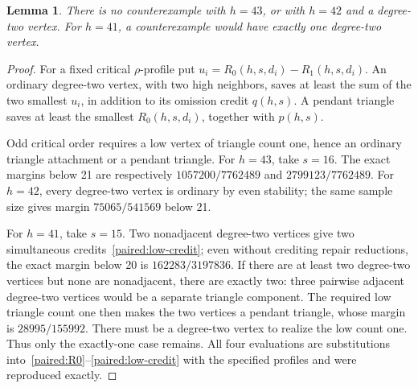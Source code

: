 \documentclass[11pt,a4paper]{article}
\newtheorem{lemma}[theorem]{Lemma}
\theoremstyle{definition}\newtheorem{definition}[theorem]{Definition}
\theoremstyle{remark}\newtheorem{remark}[theorem]{Remark}
\begin{document}
\begin{lemma}\label{paired:4342-degree2}
There is no counterexample with $h=43$, or with $h=42$ and a
degree-two vertex. For $h=41$, a counterexample would have exactly
one degree-two vertex.
\end{lemma}
\begin{proof}
For a fixed critical $\rho$-profile put $u_i=R_0(h,s,d_i)-R_1(h,s,d_i)$.
An ordinary degree-two vertex, with two high neighbors, saves at least
the sum of the two smallest $u_i$, in addition to its omission
credit $q(h,s)$. A pendant triangle saves at least the smallest
$R_0(h,s,d_i)$, together with $p(h,s)$.

Odd critical order requires a low vertex of triangle count one, hence
an ordinary triangle attachment or a pendant triangle. For $h=43$,
take $s=16$. The exact margins below 21 are respectively
$1057200/7762489$ and $2799123/7762489$. For $h=42$, every degree-two
vertex is ordinary by even stability; the same sample size gives
margin $75065/541569$ below 21.

For $h=41$, take $s=15$. Two nonadjacent degree-two vertices give
two simultaneous credits~\eqref{paired:low-credit}; even without
crediting repair reductions, the exact margin below 20 is
$162283/3197836$. If there are at least two degree-two vertices but
none are nonadjacent, there are exactly two: three pairwise adjacent
degree-two vertices would be a separate triangle component. The
required low triangle count one then makes the two vertices a
pendant triangle, whose margin is $28995/155992$. There must be a
degree-two vertex to realize the low count one. Thus only the
exactly-one case remains. All four evaluations are substitutions
into~\eqref{paired:R0}--\eqref{paired:low-credit} with the specified
profiles and were reproduced exactly.
\end{proof}
\end{document}
